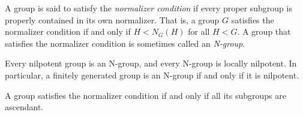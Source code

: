 \documentclass[12pt]{article}
\begin{document}

A group is said to satisfy the \emph{normalizer condition} if every proper subgroup is properly contained in its own normalizer.
That is, a group $G$ satisfies the normalizer condition if and only if
$H<N_G(H)$ for all $H<G$.
A group that satisfies the normalizer condition is sometimes called an \emph{N-group}.

Every nilpotent group is an N-group, and every N-group is locally nilpotent.
In particular, a finitely generated group is an N-group
if and only if it is nilpotent.

A group satisfies the normalizer condition if and only if all its subgroups are ascendant.
\end{document}
